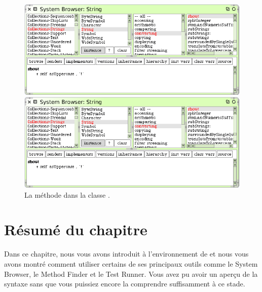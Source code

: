 \documentclass[a4paper,10pt,twoside]{book}
\begin{document}
\begin{figure}[hbt]
\ifluluelse
	{\centerline{\includegraphics[width=\textwidth]{String-Shout}}}
	{\centerline{\includegraphics[scale=0.7]{String-Shout}}}
\caption{La m\'ethode  dans la classe .\label{fig:String-shout}}
\end{figure}

\section{R\'esum\'e du chapitre}
Dans ce chapitre, nous vous avons introduit \`a l'environnement de
\sq et nous vous avons montr\'e comment utiliser certains de ses
principaux outils comme le  System Browser, le
Method Finder et le Test Runner. Vous avez pu avoir un aper\c{c}u de la
syntaxe sans que vous puissiez encore la comprendre suffisamment \`a ce stade.
\end{document}

